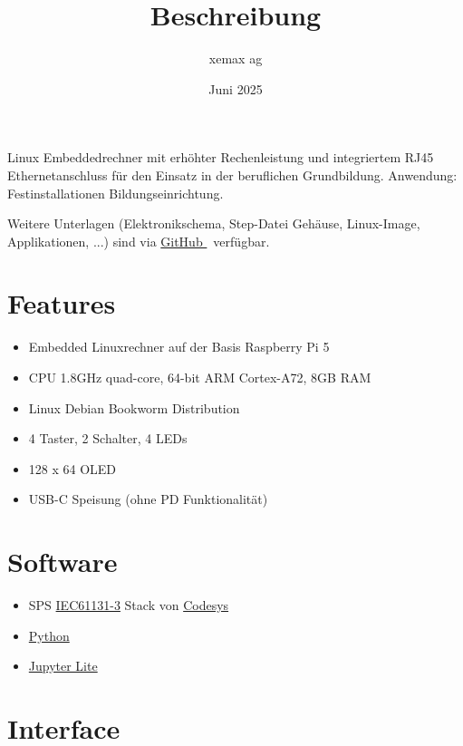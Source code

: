 \documentclass[10pt]{datasheet}
\title{Beschreibung \xlhPlattformID}
\author{xemax ag}
\date{Juni 2025}
\begin{document}
\maketitle



Linux Embeddedrechner mit erhöhter Rechenleistung und integriertem RJ45 Ethernetanschluss für den Einsatz in der beruflichen Grundbildung.
Anwendung: Festinstallationen Bildungseinrichtung.

Weitere Unterlagen (Elektronikschema, Step-Datei Gehäuse, Linux-Image, Applikationen, ...) sind via
\href{https://github.com/xemax-ag/xLH/}{GitHub \xlhPlattformID}\ verfügbar.

\section{Features}

\begin{itemize}
    \item Embedded Linuxrechner auf der Basis Raspberry Pi 5
    \item CPU 1.8GHz quad-core, 64-bit ARM Cortex-A72, 8GB RAM
    \item Linux Debian Bookworm Distribution
    \item 4 Taster, 2 Schalter, 4 LEDs
    \item 128 x 64 OLED
    \item USB-C Speisung (ohne PD Funktionalität)
\end{itemize}

\section{Software}

\begin{itemize}
    \item SPS \href{https://de.wikipedia.org/wiki/EN_61131}{IEC61131-3} Stack von \href{https://www.codesys.com/}{Codesys}
    \item \href{https://www.python.org/}{Python}
    \item \href{https://jupyter.org/try-jupyter/lab/}{Jupyter Lite}
\end{itemize}

\section{Interface}
\end{document}
